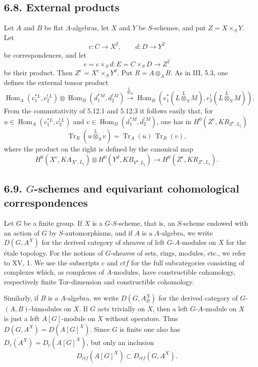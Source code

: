 \documentclass[12pt]{article}
\newcommand{\Hom}{\operatorname{Hom}}
\newcommand{\Tr}{\operatorname{Tr}}
\begin{document}
\subsection*{6.8. External products}

Let $A$ and $B$ be flat $\Lambda$-algebras, let $X$ and $Y$ be $S$-schemes, and put
$Z=X\times_S Y$. Let
\[
      c:C\to X^2,\qquad d:D\to Y^2
\]
be correspondences, and let
\[
      e=c\times_S d:E=C\times_S D\to Z^2
\]
be their product. Then $Z^e=X^c\times_S Y^d$. Put $R=A\otimes_\Lambda B$.
As in III, 5.3, one defines the external tensor product
\begin{equation}\tag{6.8.1}
\Hom_A(c_1^{*L},c_2^{!\,L})\otimes
\Hom_B(d_1^{*M},d_2^{!\,M})
\xrightarrow{\overset{L}{\otimes}_S}
\Hom_R(e_1^{*}(L\overset{L}{\otimes}_SM),e_2^{!}(L\overset{L}{\otimes}_SM)).
\end{equation}
From the commutativity of 5.12.1 and 5.12.3 it follows easily that, for
$u\in\Hom_A(c_1^{*L},c_2^{!\,L})$ and
$v\in\Hom_B(d_1^{*M},d_2^{!\,M})$, one has in
$H^0(Z^e,K R_{Z^e,L_\natural})$
\begin{equation}\tag{6.8.2}
      \Tr_R(u\overset{L}{\otimes}_S v)=\Tr_A(u)\,\Tr_B(v),
\end{equation}
where the product on the right is defined by the canonical map
\begin{equation}\tag{6.8.3}
H^0(X^c,K A_{X^c,L_\natural})\otimes
H^0(Y^d,K B_{Y^d,L_\natural})
\longrightarrow
H^0(Z^e,K R_{Z^e,L_\natural}).
\end{equation}

\subsection*{6.9. $G$-schemes and equivariant cohomological correspondences}

Let $G$ be a finite group. If $X$ is a $G$-$S$-scheme, that is, an $S$-scheme endowed
with an action of $G$ by $S$-automorphisms, and if $A$ is a $\Lambda$-algebra, we
write $D(G,A^X)$ for the derived category of sheaves of left $G$-$A$-modules on
$X$ for the étale topology. For the notions of $G$-sheaves of sets, rings, modules,
etc., we refer to XV, 1. We use the subscripts $c$ and $ctf$ for the full
subcategories consisting of complexes which, as complexes of $A$-modules, have
constructible cohomology, respectively finite Tor-dimension and constructible
cohomology.

Similarly, if $B$ is a $\Lambda$-algebra, we write $D(G,A_B^X)$ for the derived
category of $G$-$(A,B)$-bimodules on $X$. If $G$ acts trivially on $X$, then a
left $G$-$A$-module on $X$ is just a left $A[G]$-module on $X$ without operators.
Thus $D(G,A^X)=D(A[G]^X)$. Since $G$ is finite one also has
$D_c(A^X)=D_c(A[G]^X)$, but only an inclusion
\[
     D_{ctf}(A[G]^X)\subset D_{ctf}(G,A^X).
\]
\end{document}
